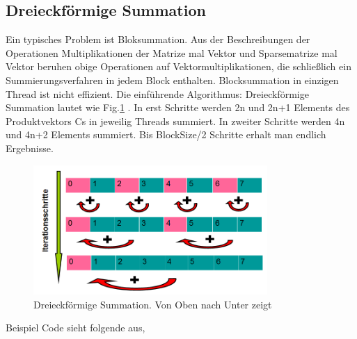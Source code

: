 

\subsection{Dreieckförmige Summation}
Ein typisches Problem ist Bloksummation. Aus der Beschreibungen der Operationen Multiplikationen der Matrize mal Vektor und Sparsematrize  mal Vektor beruhen obige Operationen auf Vektormultiplikationen, die schließlich ein Summierungsverfahren in jedem Block enthalten. Blocksummation in einzigen Thread ist nicht effizient. Die einführende Algorithmus: Dreieckförmige Summation lautet wie Fig.\ref{Dreieck} . In erst Schritte werden 2n und 2n+1 Elements des Produktvektors Cs in jeweilig Threads summiert. In zweiter Schritte werden 4n und 4n+2 Elements summiert. Bis BlockSize/2 Schritte erhalt man endlich Ergebnisse.

\begin{figure}[htbp]
\includegraphics[width=3.5in]{../xby/pic//dreieck}
\caption{\label{Dreieck}Dreieckförmige Summation. Von Oben nach Unter zeigt}
\end{figure}

Beispiel Code sieht folgende aus,


